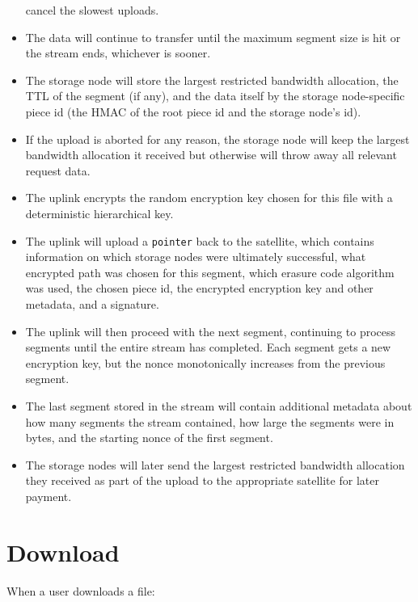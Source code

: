 \documentclass[11pt,fleqn,openany]{book}
\newcommand{\x}[1]{{\tt #1}} \newcommand{\code}[1]{{\em #1}}
\begin{document}
\begin{itemize}
  cancel the slowest uploads.
\item The data will continue to transfer until the maximum segment size is hit
  or the stream ends, whichever is sooner.
\item The storage node will store the largest restricted bandwidth allocation,
the
  TTL of the segment (if any), and the data itself by the storage node-specific
  piece
  id (the HMAC of the root piece id and the storage node's id).
\item If the upload is aborted for any reason, the storage node will keep the
  largest bandwidth allocation it received but otherwise will throw away all
  relevant request data.
\item The uplink encrypts the random encryption key chosen for this file
  with a deterministic hierarchical key.
\item The uplink will upload a \x{pointer} back to the satellite, which
  contains information on which storage nodes were
  ultimately successful, what encrypted path was chosen for this segment, which
  erasure code algorithm was used, the chosen piece id, the
  encrypted encryption key and other metadata, and a signature.
\item The uplink will then proceed with the next segment, continuing to
  process segments until the entire stream has completed. Each segment gets
  a new encryption key, but the nonce monotonically increases from the previous
  segment.
\item The last segment stored in the stream will contain additional metadata
  about how many segments the stream contained, how large the segments were
  in bytes, and the starting nonce of the first segment.
\item The storage nodes will later send the largest restricted
  bandwidth allocation they received as part of the upload to the appropriate
  satellite for later payment.
\end{itemize}

\section{Download}

When a user downloads a file:
\end{document}
